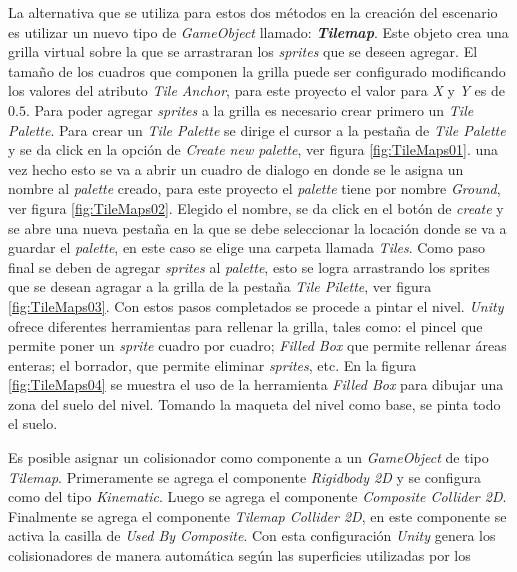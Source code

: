 La alternativa que se utiliza para estos dos métodos en la creación del 
escenario es utilizar un nuevo tipo de \textit{GameObject} llamado: 
\textit{\textbf{Tilemap}}. Este objeto crea una grilla virtual sobre la que se 
arrastraran los \textit{sprites} que se deseen agregar. El tamaño de los cuadros 
que componen la grilla puede ser configurado modificando los valores del atributo 
\textit{Tile Anchor}, para este proyecto el valor para \textit{X} y \textit{Y} 
es de $0.5$. Para poder agregar \textit{sprites} a la grilla es necesario crear 
primero un \textit{Tile Palette}. Para crear un \textit{Tile Palette} se dirige 
el cursor a la pestaña de \textit{Tile Palette} y se da click en la opción de 
\textit{Create new palette}, ver figura \ref{fig:TileMaps01}. una vez hecho esto 
se va a abrir un cuadro de dialogo en donde se le asigna un nombre al 
\textit{palette} creado, para este proyecto el \textit{palette} tiene por nombre 
\textit{Ground}, ver figura \ref{fig:TileMaps02}. Elegido el nombre, se da click 
en el botón de \textit{create} y se abre una nueva pestaña en la que se debe 
seleccionar la locación donde se va a guardar el \textit{palette}, en este caso 
se elige una carpeta llamada \textit{Tiles}. Como paso final se deben de agregar 
\textit{sprites} al \textit{palette}, esto se logra arrastrando los sprites que 
se desean agragar a la grilla de la pestaña \textit{Tile Pilette}, ver figura 
\ref{fig:TileMaps03}. Con estos pasos completados se procede a pintar el nivel. 
\textit{Unity} ofrece diferentes herramientas para rellenar la grilla, tales 
como: el pincel que permite poner un \textit{sprite} cuadro por cuadro; 
\textit{Filled Box} que permite rellenar áreas enteras; el borrador, que permite 
eliminar \textit{sprites}, etc. En la figura \ref{fig:TileMaps04} se muestra el 
uso de la herramienta \textit{Filled Box} para dibujar una zona del suelo del 
nivel. Tomando la maqueta del nivel como base, se pinta todo el suelo. 
\\
\par
Es posible asignar un colisionador como componente a un \textit{GameObject} de 
tipo \textit{Tilemap}. Primeramente se agrega el componente \textit{Rigidbody 
2D} y se configura como del tipo \textit{Kinematic}. Luego se agrega el 
componente \textit{Composite Collider 2D}. Finalmente se agrega el componente 
\textit{Tilemap Collider 2D}, en este componente se activa la casilla de 
\textit{Used By Composite}. Con esta configuración \textit{Unity} genera los 
colisionadores de manera automática según las superficies utilizadas por los 
